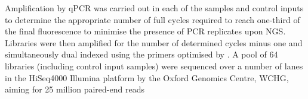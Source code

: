 Amplification by qPCR was carried out in each of the samples and control inputs to determine the appropriate number of full cycles required to reach one-third of the final fluorescence to minimise the presence of PCR replicates upon NGS. Libraries were then amplified for the number of determined cycles minus one and simultaneously dual indexed using the primers optimised by \parencite{Buenrostro2015}. A pool of 64 libraries (including control input samples) were sequenced over a number of lanes in the HiSeq4000 Illumina platform by the Oxford Genomics Centre, WCHG, aiming for 25 million paired-end reads



